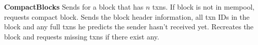 


{
\begin{myprot}{\textbf{CompactBlocks}}
\label{protocol:compact}
\STATE \sender \hspace{-5ex}Sends \inv for a block that has $n$ txns.
\STATE \recvr \hspace{-5ex}If block is not in mempool, requests compact block.
\STATE \sender \hspace{-5ex}Sends the block header information, all txn IDs in the block and any full txns he predicts the sender hasn't received yet.
\STATE \recvr \hspace{-5ex}Recreates the block and requests missing txns if there exist any.
\end{myprot}
}

